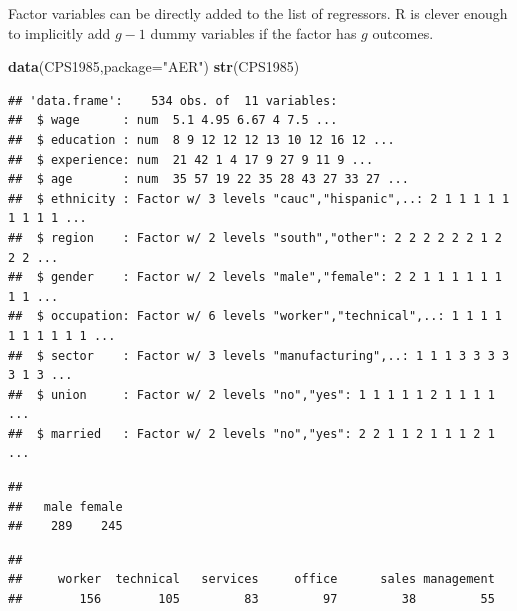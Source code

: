 \documentclass[]{book}
\newenvironment{Shaded}{\begin{snugshade}}{\end{snugshade}}
\newcommand{\CommentTok}[1]{\textcolor[rgb]{0.56,0.35,0.01}{\textit{#1}}}
\newcommand{\DataTypeTok}[1]{\textcolor[rgb]{0.13,0.29,0.53}{#1}}
\newcommand{\KeywordTok}[1]{\textcolor[rgb]{0.13,0.29,0.53}{\textbf{#1}}}
\newcommand{\NormalTok}[1]{#1}
\newcommand{\OperatorTok}[1]{\textcolor[rgb]{0.81,0.36,0.00}{\textbf{#1}}}
\newcommand{\StringTok}[1]{\textcolor[rgb]{0.31,0.60,0.02}{#1}}
\begin{document}
Factor variables can be directly added to the list of regressors. R is clever enough to implicitly add \(g-1\) dummy variables if the factor has \(g\) outcomes.

\begin{Shaded}
\begin{Highlighting}[]
\KeywordTok{data}\NormalTok{(CPS1985,}\DataTypeTok{package=}\StringTok{"AER"}\NormalTok{)}
\KeywordTok{str}\NormalTok{(CPS1985)}
\end{Highlighting}
\end{Shaded}

\begin{verbatim}
## 'data.frame':    534 obs. of  11 variables:
##  $ wage      : num  5.1 4.95 6.67 4 7.5 ...
##  $ education : num  8 9 12 12 12 13 10 12 16 12 ...
##  $ experience: num  21 42 1 4 17 9 27 9 11 9 ...
##  $ age       : num  35 57 19 22 35 28 43 27 33 27 ...
##  $ ethnicity : Factor w/ 3 levels "cauc","hispanic",..: 2 1 1 1 1 1 1 1 1 1 ...
##  $ region    : Factor w/ 2 levels "south","other": 2 2 2 2 2 2 1 2 2 2 ...
##  $ gender    : Factor w/ 2 levels "male","female": 2 2 1 1 1 1 1 1 1 1 ...
##  $ occupation: Factor w/ 6 levels "worker","technical",..: 1 1 1 1 1 1 1 1 1 1 ...
##  $ sector    : Factor w/ 3 levels "manufacturing",..: 1 1 1 3 3 3 3 3 1 3 ...
##  $ union     : Factor w/ 2 levels "no","yes": 1 1 1 1 1 2 1 1 1 1 ...
##  $ married   : Factor w/ 2 levels "no","yes": 2 2 1 1 2 1 1 1 2 1 ...
\end{verbatim}

\begin{Shaded}
\end{Shaded}

\begin{verbatim}
## 
##   male female 
##    289    245
\end{verbatim}

\begin{Shaded}
\end{Shaded}

\begin{verbatim}
## 
##     worker  technical   services     office      sales management 
##        156        105         83         97         38         55
\end{verbatim}
\end{document}
